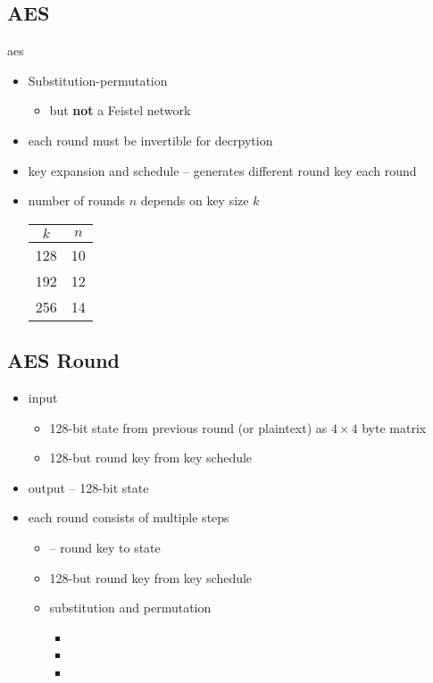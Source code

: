 \documentclass[final]{article}
\begin{document}
\subsection{AES}
\acrfull{aes}
\begin{itemize}[nosep]
    \item Substitution-permutation
          \begin{itemize}[nosep]\item but \textbf{not} a Feistel network\end{itemize}
    \item each round must be invertible for decrpytion
    \item key expansion and schedule -- generates different round key each round
    \item number of rounds $n$ depends on key size $k$

          \begin{tabular}{cc}
              $k$ & $n$ \\\toprule
              128 & 10  \\
              192 & 12  \\
              256 & 14  \\\bottomrule
          \end{tabular}
\end{itemize}
\subsection{AES Round}
\begin{itemize}[nosep]
    \item input
          \begin{itemize}[nosep]
              \item 128-bit state from previous round (or plaintext) as $4\times4$ byte matrix
              \item 128-but round key from key schedule
          \end{itemize}
    \item output -- 128-bit state
    \item each round consists of multiple steps
          \begin{itemize}[nosep]
              \item {} --  round key to state
              \item 128-but round key from key schedule
              \item substitution and permutation
                    \begin{itemize}[nosep]
                        \item {}
                        \item {}
                        \item {}
                    \end{itemize}
          \end{itemize}
\end{itemize}
\end{document}
